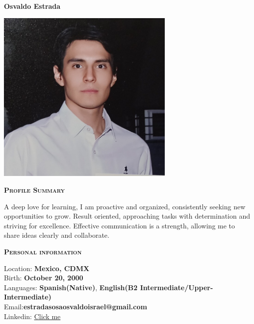 \documentclass[11pt, a4paper]{article}
\newcommand{\headleft}[1]{\vspace*{3ex}\textsc{\textbf{#1}}\par%
    \vspace*{-1.5ex}\hrulefill\par\vspace*{0.7ex}}
\begin{document}
\setlength{\topskip}{0pt}
\setlength{\parindent}{0pt}
\setlength{\parskip}{0pt}
\setlength{\fboxsep}{0pt}
\pagestyle{empty}
\raggedbottom

\begin{minipage}[t]{0.33\textwidth} %
\colorbox{cvblue}{\begin{minipage}[t][5mm][t]{\textwidth}\null\hfill\null\end{minipage}}

\vspace{-.2ex} %
\colorbox{cvblue!90}{\color{white}  %
\textwidth\relax%
\begin{minipage}[t][293mm][t]{0.82\textwidth}
\raggedright
\vspace*{2.5ex}

\Large \textbf{Osvaldo Estrada} \normalsize

\null\hfill\includegraphics[width=0.65\textwidth]{osvaldo.jpg}\hfill\null

\vspace*{0.5ex} %

\headleft{Profile Summary}
A deep love for learning, I am
proactive and organized, consistently
seeking new opportunities to grow.
Result oriented, approaching tasks
with determination and striving for
excellence. Effective communication
is a strength, allowing me to share
ideas clearly and collaborate.


\headleft{Personal information}
Location: \textbf{Mexico, CDMX} \\[0.5ex]
Birth: \textbf{October 20, 2000} \\[0.5ex]
Languages: \textbf{Spanish(Native)}, \textbf{English(B2 Intermediate/Upper-Intermediate)} \\[0.5ex]
Email:\textbf{estradasosaosvaldoisrael@gmail.com} \\[0.5ex]
Linkedin: \href{https://www.linkedin.com/in/osvaldo-israel-estrada-sosa-19529919a/}{Click me}


\end{minipage}}
\end{minipage}
\end{document}
